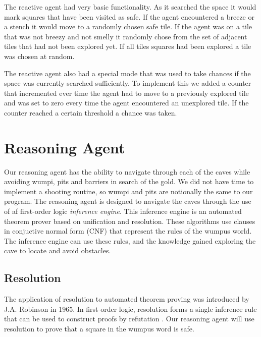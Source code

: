\documentclass{article}
\begin{document}
The reactive agent had very basic functionality.
 As it searched the space it would mark squares that have been visited as safe.
  If the agent encountered a breeze or a stench it would move to a randomly chosen safe tile.
   If the agent was on a tile that was not breezy and not smelly it randomly chose from the set of adjacent tiles that had not been explored yet.
    If all tiles squares had been explored a tile was chosen at random.

The reactive agent also had a special mode that was used to take chances if the space was currently searched sufficiently.
 To implement this we added a counter that incremented ever time the agent had to move to a previously explored tile and was set to zero every time the agent encountered an unexplored tile.
  If the counter reached a certain threshold a chance was taken.

\section{Reasoning Agent}
Our reasoning agent has the ability to navigate through each of the caves while avoiding wumpi, pits and barriers in search of the gold. We did not have time to implement a shooting routine, so wumpi and pits are notionally the same to our program. The reasoning agent is designed to navigate the caves through the use of af first-order logic \textit{inference engine}. This inference engine is an automated theorem prover based on unification and resolution. These algorithms use clauses in conjuctive normal form (CNF) that represent the rules of the wumpus world. The inference engine can use these rules, and the knowledge gained exploring the cave to locate and avoid obstacles.

\subsection{Resolution}
The application of resolution to automated theorem proving was introduced by J.A. Robinson in 1965.
In first-order logic, resolution forms a single inference rule that can be used to construct proofs by refutation \cite{robinson}. 
Our reasoning agent will use resolution to prove that a square in the wumpus word is safe.
\end{document}
